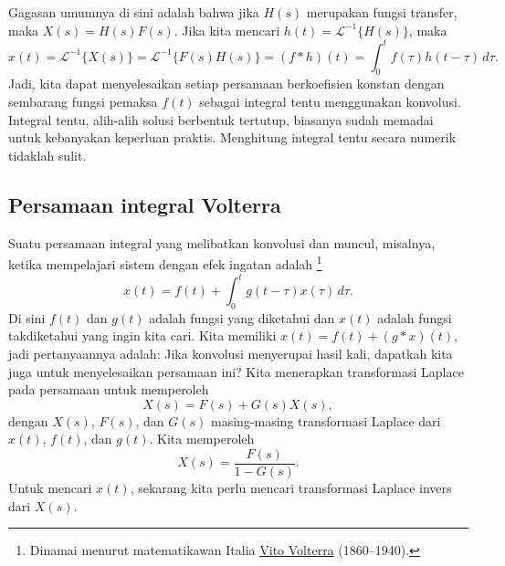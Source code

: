 Gagasan umumnya di sini adalah bahwa jika $H(s)$ merupakan fungsi transfer, maka
$X(s)=H(s)F(s)$.
Jika kita mencari $h(t) = {\mathcal{L}}^{-1}\bigl\{ H(s) \bigr\}$, maka
\begin{equation*}
x(t)
= {\mathcal{L}}^{-1}\bigl\{ X(s) \bigr\}
= {\mathcal{L}}^{-1}\bigl\{ F(s)H(s) \bigr\}
= (f * h)(t)
= \int_0^t f(\tau) h(t-\tau) \, d\tau .
\end{equation*}
Jadi,
kita dapat menyelesaikan setiap persamaan berkoefisien konstan dengan sembarang fungsi
pemaksa $f(t)$ sebagai integral tentu menggunakan konvolusi.
Integral tentu, alih-alih solusi berbentuk tertutup, biasanya sudah memadai
untuk kebanyakan keperluan praktis.  Menghitung integral tentu secara numerik
tidaklah sulit.

\subsection{Persamaan integral Volterra}

Suatu persamaan integral
yang melibatkan konvolusi
dan muncul, misalnya, ketika mempelajari sistem dengan efek ingatan
adalah \emph{}%
\footnote{Dinamai menurut matematikawan Italia
\href{https://en.wikipedia.org/wiki/Vito_Volterra}{Vito Volterra}
(1860--1940).}
\begin{equation*}
x(t) = f(t) + \int_0^t g(t-\tau) x(\tau) \, d\tau .
\end{equation*}
Di sini $f(t)$ dan $g(t)$ adalah fungsi yang diketahui dan $x(t)$ adalah fungsi takdiketahui yang
ingin kita cari.
Kita memiliki $x(t) = f(t) + (g * x)(t)$, jadi pertanyaannya adalah:
Jika konvolusi
menyerupai hasil kali, dapatkah kita juga  untuk menyelesaikan persamaan ini?
Kita menerapkan transformasi Laplace pada persamaan untuk memperoleh 
\begin{equation*}
X(s) = F(s) + G(s) X(s) ,
\end{equation*}
dengan $X(s)$, $F(s)$, dan $G(s)$ masing-masing transformasi Laplace dari $x(t)$, $f(t)$, dan
$g(t)$.  Kita memperoleh
\begin{equation*}
X(s) = \frac{F(s)}{1-G(s)} .
\end{equation*}
Untuk mencari $x(t)$, sekarang kita perlu mencari 
transformasi Laplace invers dari $X(s)$.

